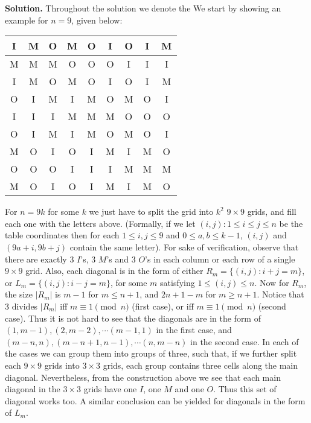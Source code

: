 \documentclass[11pt,a4paper]{article}
\begin{document}
\begin{itemize}
\textbf{Solution.} 
Throughout the solution we denote the 
We start by showing an example for $n=9$, given below: 
\begin{center}
\begin{tabular}{|c|c|c||c|c|c||c|c|c|}
\hline
I & M & O & M & O & I & O & I & M\\
\hline
M & M & M & O & O & O & I & I & I\\
\hline
I & M & O & M & O & I & O & I & M\\
\hline
\hline
O & I & M & I & M & O & M & O & I\\
\hline
I & I & I & M & M & M & O & O & O\\
\hline
O & I & M & I & M & O & M & O & I\\
\hline
\hline
M & O & I & O & I & M & I & M & O\\
\hline
O & O & O & I & I & I & M & M & M\\
\hline
M & O & I & O & I & M & I & M & O\\
\hline
\end{tabular}
\end{center}
For $n=9k$ for some $k$ we just have to split the grid into $k^2$ $9\times 9$ grids, and fill each one with the letters above. 
(Formally, if we let $(i, j): 1\le i\le j\le n$ be the table coordinates then for each $1\le i, j\le 9$ and $0\le a, b\le k-1$, 
$(i, j)$ and $(9a+i, 9b+j)$ contain the same letter). 
For sake of verification, observe that there are exactly 3 $I$'s, 3 $M$'s and 3 $O$'s in each column or each row of a single $9\times 9$ grid. 
Also, each diagonal is in the form of either $R_m=\{(i, j): i+j=m\}$, or $L_m=\{(i, j): i-j=m\}$, 
for some $m$ satisfying $1\le (i, j)\le n$. 
Now for $R_m$, the size $|R_m|$ is $m-1$ for $m\le n+1$, and $2n+1-m$ for $m\ge n+1$. 
Notice that 3 divides $|R_m|$ iff $m\equiv 1\pmod{n}$ (first case), or iff  $m\equiv 1\pmod{n}$ (second case). 
Thus it is not hard to see that the diagonals are in the form of 
$(1, m-1), (2, m-2), \cdots (m-1, 1)$ in the first case, and 
$(m-n, n), (m-n+1, n-1), \cdots (n, m-n)$ in the second case. 
In each of the cases we can group them into groups of three, such that, if we further split each $9\times 9$ grids into $3\times 3$ grids, each group contains three cells along the main diagonal. 
Nevertheless, from the construction above we see that each main diagonal in the $3\times 3$ grids have one $I$, one $M$ and one $O$. 
Thus this set of diagonal works too. 
A similar conclusion can be yielded for diagonals in the form of $L_m$. 


\end{itemize}
\end{document}
